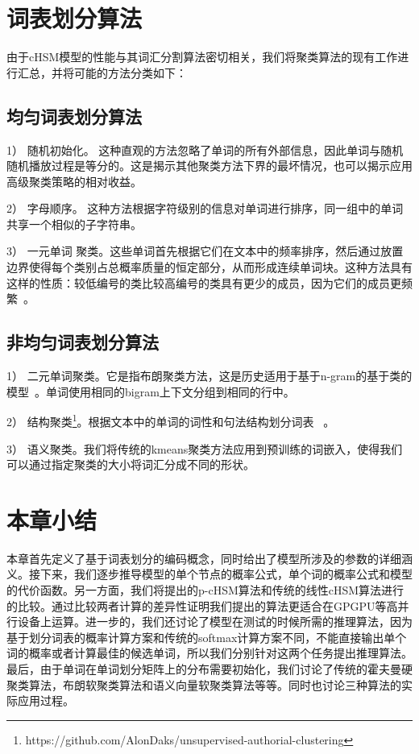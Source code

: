 \section{词表划分算法}
由于cHSM模型的性能与其词汇分割算法密切相关，我们将聚类算法的现有工作进行汇总，并将可能的方法分类如下：

\subsection{均匀词表划分算法}
1） 随机初始化。 这种直观的方法忽略了单词的所有外部信息，因此单词与随机随机播放过程是等分的。这是揭示其他聚类方法下界的最坏情况，也可以揭示应用高级聚类策略的相对收益。

2） 字母顺序。 这种方法根据字符级别的信息对单词进行排序，同一组中的单词共享一个相似的子字符串。

3） 一元单词 聚类。这些单词首先根据它们在文本中的频率排序，然后通过放置边界使得每个类别占总概率质量的恒定部分，从而形成连续单词块。这种方法具有这样的性质：较低编号的类比较高编号的类具有更少的成员，因为它们的成员更频繁~。


\subsection{非均匀词表划分算法}
1） 二元单词聚类。它是指布朗聚类方法，这是历史适用于基于n-gram的基于类的模型~。单词使用相同的bigram上下文分组到相同的行中。

2） 结构聚类\footnote{https://github.com/AlonDaks/unsupervised-authorial-clustering}。根据文本中的单词的词性和句法结构划分词表~ 。

3） 语义聚类。我们将传统的kmeans聚类方法应用到预训练的词嵌入，使得我们可以通过指定聚类的大小将词汇分成不同的形状。

\section{本章小结}
本章首先定义了基于词表划分的编码概念，同时给出了模型所涉及的参数的详细涵义。接下来，我们逐步推导模型的单个节点的概率公式，单个词的概率公式和模型的代价函数。另一方面，我们将提出的p-cHSM算法和传统的线性cHSM算法进行的比较。通过比较两者计算的差异性证明我们提出的算法更适合在GPGPU等高并行设备上运算。进一步的，我们还讨论了模型在测试的时候所需的推理算法，因为基于划分词表的概率计算方案和传统的softmax计算方案不同，不能直接输出单个词的概率或者计算最佳的候选单词，所以我们分别针对这两个任务提出推理算法。最后，由于单词在单词划分矩阵上的分布需要初始化，我们讨论了传统的霍夫曼硬聚类算法，布朗软聚类算法和语义向量软聚类算法等等。同时也讨论三种算法的实际应用过程。